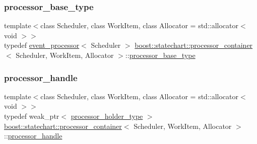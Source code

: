 \mbox{\label{classboost_1_1statechart_1_1processor__container_a9d1537cda77f083b3a65a67d8ffd1f2a}} 
\subsubsection{\texorpdfstring{processor\+\_\+base\+\_\+type}{processor\_base\_type}}
{\footnotesize\ttfamily template$<$class Scheduler, class Work\+Item, class Allocator = std\+::allocator$<$ void $>$$>$ \\
typedef \mbox{\hyperlink{classboost_1_1statechart_1_1event__processor}{event\+\_\+processor}}$<$ Scheduler $>$ \mbox{\hyperlink{classboost_1_1statechart_1_1processor__container}{boost\+::statechart\+::processor\+\_\+container}}$<$ Scheduler, Work\+Item, Allocator $>$\+::\mbox{\hyperlink{classboost_1_1statechart_1_1processor__container_a9d1537cda77f083b3a65a67d8ffd1f2a}{processor\+\_\+base\+\_\+type}}\hspace{0.3cm}{\ttfamily [private]}}

\mbox{\label{classboost_1_1statechart_1_1processor__container_a82ebbffaed81d7b99119ae0e892f6411}} 
\subsubsection{\texorpdfstring{processor\+\_\+handle}{processor\_handle}}
{\footnotesize\ttfamily template$<$class Scheduler, class Work\+Item, class Allocator = std\+::allocator$<$ void $>$$>$ \\
typedef weak\+\_\+ptr$<$ \mbox{\hyperlink{classboost_1_1statechart_1_1processor__container_a3e774bbec52b2b0b9f0dfcde42f33b49}{processor\+\_\+holder\+\_\+type}} $>$ \mbox{\hyperlink{classboost_1_1statechart_1_1processor__container}{boost\+::statechart\+::processor\+\_\+container}}$<$ Scheduler, Work\+Item, Allocator $>$\+::\mbox{\hyperlink{classboost_1_1statechart_1_1processor__container_a82ebbffaed81d7b99119ae0e892f6411}{processor\+\_\+handle}}}

